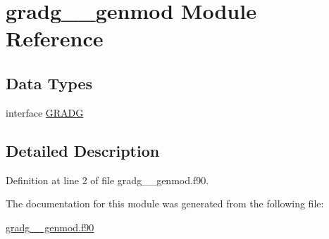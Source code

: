 \hypertarget{classgradg____genmod}{\section{gradg\+\_\+\+\_\+genmod Module Reference}
\label{classgradg____genmod}
}
\subsection*{Data Types}
\begin{DoxyCompactItemize}
\item 
interface \hyperlink{interfacegradg____genmod_1_1GRADG}{G\+R\+A\+D\+G}
\end{DoxyCompactItemize}


\subsection{Detailed Description}


Definition at line 2 of file gradg\+\_\+\+\_\+genmod.\+f90.



The documentation for this module was generated from the following file\+:\begin{DoxyCompactItemize}
\item 
\hyperlink{gradg____genmod_8f90}{gradg\+\_\+\+\_\+genmod.\+f90}\end{DoxyCompactItemize}
